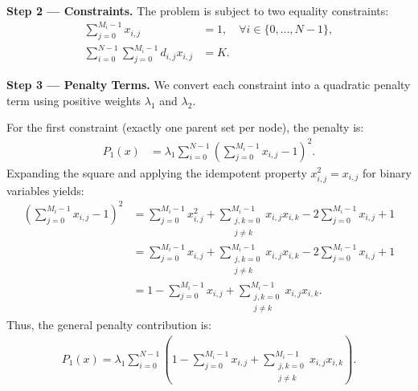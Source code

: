 \documentclass[12pt]{article}
\begin{document}
\textbf{Step 2 --- Constraints.} The problem is subject to two equality constraints:
\begin{align}
    \sum_{j=0}^{M_i-1} x_{i,j} &= 1, \quad \forall i \in \{0, \dots, N-1\}, \\
    \sum_{i=0}^{N-1} \sum_{j=0}^{M_i-1} d_{i,j} x_{i,j} &= K.
\end{align}

\textbf{Step 3 --- Penalty Terms.} We convert each constraint into a quadratic penalty term using positive weights $\lambda_1$ and $\lambda_2$.

For the first constraint (exactly one parent set per node), the penalty is:
\begin{align}
    P_1(x) &= \lambda_1 \sum_{i=0}^{N-1} \left( \sum_{j=0}^{M_i-1} x_{i,j} - 1 \right)^2.
\end{align}
Expanding the square and applying the idempotent property $x_{i,j}^2 = x_{i,j}$ for binary variables yields:
\begin{align}
    \left( \sum_{j=0}^{M_i-1} x_{i,j} - 1 \right)^2 &= \sum_{j=0}^{M_i-1} x_{i,j}^2 + \sum_{\substack{j,k=0 \\ j \neq k}}^{M_i-1} x_{i,j} x_{i,k} - 2 \sum_{j=0}^{M_i-1} x_{i,j} + 1 \nonumber \\
    &= \sum_{j=0}^{M_i-1} x_{i,j} + \sum_{\substack{j,k=0 \\ j \neq k}}^{M_i-1} x_{i,j} x_{i,k} - 2 \sum_{j=0}^{M_i-1} x_{i,j} + 1 \nonumber \\
    &= 1 - \sum_{j=0}^{M_i-1} x_{i,j} + \sum_{\substack{j,k=0 \\ j \neq k}}^{M_i-1} x_{i,j} x_{i,k}.
\end{align}
Thus, the general penalty contribution is:
\begin{align}
    P_1(x) = \lambda_1 \sum_{i=0}^{N-1} \left( 1 - \sum_{j=0}^{M_i-1} x_{i,j} + \sum_{\substack{j,k=0 \\ j \neq k}}^{M_i-1} x_{i,j} x_{i,k} \right).
\end{align}
\end{document}
